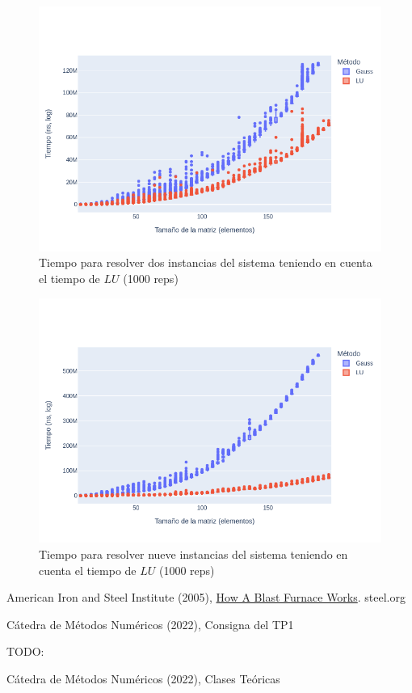 \documentclass[12pt]{article}
\begin{document}
\begin{figure}[H]
\centering
\includegraphics[scale=0.5]{times.2.t_solve_lu}
\caption{Tiempo para resolver dos instancias del sistema teniendo en cuenta el tiempo de \(LU\) (1000 reps)}
\label{fig:time.2solve}
\end{figure}

\begin{figure}[H]
\centering
\includegraphics[scale=0.5]{times.9.t_solve_lu}
\caption{Tiempo para resolver nueve instancias del sistema teniendo en cuenta el tiempo de \(LU\) (1000 reps)}
\label{fig:time.9solve}
\end{figure}

\listoffigures

\begin{thebibliography}{9}
American Iron and Steel Institute (2005), \href{https://web.archive.org/web/20070510164459/http://www.steel.org/AM/Template.cfm?Section=Home&template=%2FCM%2FHTMLDisplay.cfm&ContentID=5433}{How A Blast Furnace Works}. steel.org

Cátedra de Métodos Numéricos (2022), Consigna del TP1

TODO:

Cátedra de Métodos Numéricos (2022), Clases Teóricas

\end{thebibliography}
\end{document}
